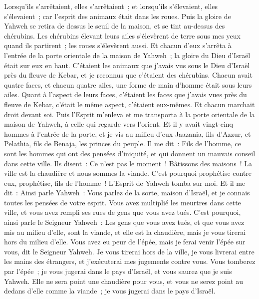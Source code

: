 \begin{multicols}{2}
Lorsqu'ils s'arrêtaient, elles s'arrêtaient~; et lorsqu'ils s'élevaient, elles s'élevaient~; car l'esprit des animaux était dans les roues.
Puis la gloire de Yahweh se retira de dessus le seuil de la maison, et se tint au-dessus des chérubins.
Les chérubins élevant leurs ailes s'élevèrent de terre sous mes yeux quand ils partirent~; les roues s'élevèrent aussi. Et chacun d'eux s'arrêta à l'entrée de la porte orientale de la maison de Yahweh~; la gloire du Dieu d'Israël était sur eux en haut.
C'étaient les animaux que j'avais vus sous le Dieu d'Israël près du fleuve de Kebar, et je reconnus que c'étaient des chérubins.
Chacun avait quatre faces, et chacun quatre ailes, une forme de main d'homme était sous leurs ailes.
Quant à l'aspect de leurs faces, c'étaient les faces que j'avais vues près du fleuve de Kebar, c'était le même aspect, c'étaient eux-mêmes. Et chacun marchait droit devant soi.
\VerseOne{}Puis l'Esprit m'enleva et me transporta à la porte orientale de la maison de Yahweh, à celle qui regarde vers l'orient. Et il y avait vingt-cinq hommes à l'entrée de la porte, et je vis au milieu d'eux Jaazania, fils d'Azzur, et Pelathia, fils de Benaja, les princes du peuple.
Il me dit~: Fils de l'homme, ce sont les hommes qui ont des pensées d'iniquité, et qui donnent un mauvais conseil dans cette ville.
Ils disent~: Ce n'est pas le moment~! Bâtissons des maisons~! La ville est la chaudière et nous sommes la viande.
C'est pourquoi prophétise contre eux, prophétise, fils de l'homme~!
L'Esprit de Yahweh tomba sur moi. Et il me dit~: Ainsi parle Yahweh~: Vous parlez de la sorte, maison d'Israël, et je connais toutes les pensées de votre esprit.
Vous avez multiplié les meurtres dans cette ville, et vous avez rempli ses rues de gens que vous avez tués.
C'est pourquoi, ainsi parle le Seigneur Yahweh~: Les gens que vous avez tués, et que vous avez mis au milieu d'elle, sont la viande, et elle est la chaudière, mais je vous tirerai hors du milieu d'elle.
Vous avez eu peur de l'épée, mais je ferai venir l'épée sur vous, dit le Seigneur Yahweh.
Je vous tirerai hors de la ville, je vous livrerai entre les mains des étrangers, et j'exécuterai mes jugements contre vous.
Vous tomberez par l'épée~; je vous jugerai dans le pays d'Israël, et vous saurez que je suis Yahweh.
Elle ne sera point une chaudière pour vous, et vous ne serez point au dedans d'elle comme la viande~; je vous jugerai dans le pays d'Israël.

\end{multicols}
